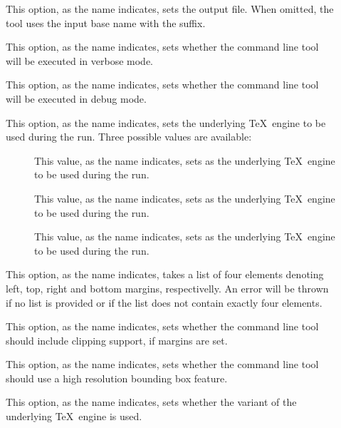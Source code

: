 \begin{description}
\begin{description}
\item[] This option, as the name indicates, sets the output file. When omitted, the tool uses the input base name with the  suffix.

\item[] This option, as the name indicates, sets whether the command line tool will be executed in verbose mode.

\item[] This option, as the name indicates, sets whether the command line tool will be executed in debug mode.

\item[] This option, as the name indicates, sets the underlying \TeX\ engine to be used during the run. Three possible values are available:

\begin{description}
\item[] This value, as the name indicates, sets  as the underlying \TeX\ engine to be used during the run.

\item[] This value, as the name indicates, sets  as the underlying \TeX\ engine to be used during the run.

\item[] This value, as the name indicates, sets  as the underlying \TeX\ engine to be used during the run.
\end{description}

\item[] This option, as the name indicates, takes a list of four elements denoting left, top, right and bottom margins, respectivelly. An error will be thrown if no list is provided or if the list does not contain exactly four elements.

\item[] This option, as the name indicates, sets whether the command line tool should include clipping support, if margins are set.

\item[] This option, as the name indicates, sets whether the command line tool should use a high resolution bounding box feature.

\item[] This option, as the name indicates, sets whether the  variant of the underlying \TeX\ engine is used.


\end{description}
\end{description}
